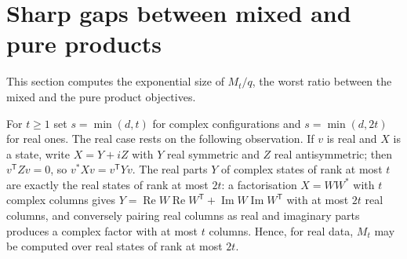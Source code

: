 \documentclass[11pt,a4paper]{article}
\theoremstyle{remark}
\begin{document}
\section{Sharp gaps between mixed and pure products}\label{sec:gap}
This section computes the exponential size of $M_t/q$, the worst ratio between the mixed and the pure product objectives.

For $t\ge1$ set $s=\min(d,t)$ for complex configurations and $s=\min(d,2t)$ for real ones. The real case rests on the following observation. If $v$ is real and $X$ is a state, write $X=Y+iZ$ with $Y$ real symmetric and $Z$ real antisymmetric; then $v^{\mathsf T}Zv=0$, so $v^*Xv=v^{\mathsf T}Yv$. The real parts $Y$ of complex states of rank at most $t$ are exactly the real states of rank at most $2t$: a factorisation $X=WW^*$ with $t$ complex columns gives $Y=\operatorname{Re}W\operatorname{Re}W^{\mathsf T}+\operatorname{Im}W\operatorname{Im}W^{\mathsf T}$ with at most $2t$ real columns, and conversely pairing real columns as real and imaginary parts produces a complex factor with at most $t$ columns. Hence, for real data, $M_t$ may be computed over real states of rank at most $2t$.
\end{document}
